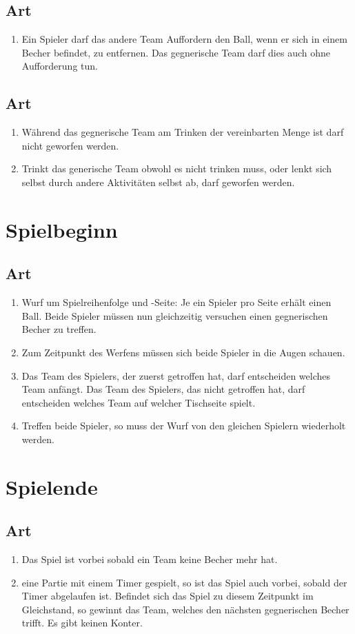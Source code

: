\documentclass[a4paper,11pt]{scrartcl}
\newcommand{\enum}[1]{\begin{enumerate}[label=(\arabic*)]#1\end{enumerate}}
\newcommand{\art}[2]{\subsection*{#1} \enum{#2}}
\newcounter{art}
\begin{document}
    \art{Art \theart}{
        \item
            Ein Spieler darf das andere Team Auffordern den Ball, wenn er sich in einem Becher befindet, zu entfernen. Das gegnerische Team darf dies auch ohne Aufforderung tun.
    }

    \art{Art \theart}{
        \item
            Während das gegnerische Team am Trinken der vereinbarten Menge ist darf nicht geworfen werden.
        \item
            Trinkt das generische Team obwohl es nicht trinken muss, oder lenkt sich selbst durch andere Aktivitäten selbst ab, darf geworfen werden.
    }

\section{Spielbeginn}
    \art{Art \theart}{
        \item
            Wurf um Spielreihenfolge und -Seite: Je ein Spieler pro Seite erhält einen Ball. Beide Spieler müssen nun gleichzeitig versuchen einen gegnerischen Becher zu treffen.
        \item
            Zum Zeitpunkt des Werfens müssen sich beide Spieler in die Augen schauen.
        \item
            Das Team des Spielers, der zuerst getroffen hat, darf entscheiden welches Team anfängt. Das Team des Spielers, das nicht getroffen hat, darf entscheiden welches Team auf welcher Tischseite spielt.
        \item
            Treffen beide Spieler, so muss der Wurf von den gleichen Spielern wiederholt werden.
    }

\section{Spielende}
    \art{Art \theart}{
        \item
            Das Spiel ist vorbei sobald ein Team keine Becher mehr hat.
        \item
             eine Partie mit einem Timer gespielt, so ist das Spiel auch vorbei, sobald der Timer abgelaufen ist. Befindet sich das Spiel zu diesem Zeitpunkt im Gleichstand, so gewinnt das Team, welches den nächsten gegnerischen Becher trifft. Es gibt keinen Konter.
    }
\end{document}
